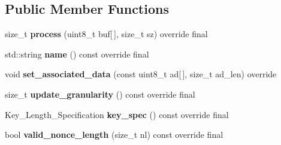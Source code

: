 \subsection*{Public Member Functions}
\begin{DoxyCompactItemize}
\item 
\mbox{\label{class_botan_1_1_t_l_s_1_1_t_l_s___c_b_c___h_m_a_c___a_e_a_d___mode_abdea3f8baa58c545376d6ecc6337a6d0}} 
size\+\_\+t {\bfseries process} (uint8\+\_\+t buf\mbox{[}$\,$\mbox{]}, size\+\_\+t sz) override final
\item 
\mbox{\label{class_botan_1_1_t_l_s_1_1_t_l_s___c_b_c___h_m_a_c___a_e_a_d___mode_add15c8375b3365f217915118333d8575}} 
std\+::string {\bfseries name} () const override final
\item 
\mbox{\label{class_botan_1_1_t_l_s_1_1_t_l_s___c_b_c___h_m_a_c___a_e_a_d___mode_a34dd69cef36336fe7803bddf6cc64701}} 
void {\bfseries set\+\_\+associated\+\_\+data} (const uint8\+\_\+t ad\mbox{[}$\,$\mbox{]}, size\+\_\+t ad\+\_\+len) override
\item 
\mbox{\label{class_botan_1_1_t_l_s_1_1_t_l_s___c_b_c___h_m_a_c___a_e_a_d___mode_aed7cf6aa3eb4656791d090b8897094af}} 
size\+\_\+t {\bfseries update\+\_\+granularity} () const override final
\item 
\mbox{\label{class_botan_1_1_t_l_s_1_1_t_l_s___c_b_c___h_m_a_c___a_e_a_d___mode_a70e37431fcf5c94a01f4311f8118856d}} 
Key\+\_\+\+Length\+\_\+\+Specification {\bfseries key\+\_\+spec} () const override final
\item 
\mbox{\label{class_botan_1_1_t_l_s_1_1_t_l_s___c_b_c___h_m_a_c___a_e_a_d___mode_a60dcda67b7446ba65a06d7036280e974}} 
bool {\bfseries valid\+\_\+nonce\+\_\+length} (size\+\_\+t nl) const override final
\item 
\mbox{\label{class_botan_1_1_t_l_s_1_1_t_l_s___c_b_c___h_m_a_c___a_e_a_d___mode_ac2a32200f964da4349692316b55d7314}} 

\end{DoxyCompactItemize}
